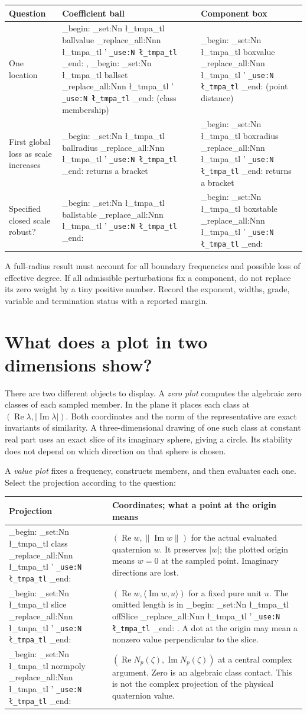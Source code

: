 \documentclass[11pt,a4paper]{article}
\newcommand{\m}[1]{
  \group_begin:
  \tl_set:Nn \l_tmpa_tl {#1}
  \tl_replace_all:Nnn \l_tmpa_tl {'}{\textquotesingle{}}
  \texttt{\tl_use:N \l_tmpa_tl}
  \group_end:
}
\newcommand{\topic}[2]{\clearpage\section{#1}\label{#2}}
\begin{document}
\par\smallskip\noindent\begin{tabularx}{\linewidth}{@{}p{.22\linewidth}YY@{}}\toprule
Question & Coefficient ball & Component box\\\midrule
One location & \m{ballvalue}, \m{ballset} (class membership) & \m{boxvalue} (point distance)\\
First global loss as scale increases & \m{ballradius} returns a bracket & \m{boxradius} returns a bracket\\
Specified closed scale robust? & \m{ballstable} & \m{boxstable}\\\bottomrule
\end{tabularx}\par\smallskip
A full-radius result must account for all boundary frequencies and possible loss of effective degree. If all admissible perturbations fix a component, do not replace its zero weight by a tiny positive number. Record the exponent, widths, grade, variable and termination status with a reported margin.
\topic{What does a plot in two dimensions show?}{sec:plot}
There are two different objects to display. A \emph{zero plot} computes the algebraic zero classes of each sampled member. In the plane it places each class at $(\operatorname{Re}\lambda,|\operatorname{Im}\lambda|)$. Both coordinates and the norm of the representative are exact invariants of similarity. A three-dimensional drawing of one such class at constant real part uses an exact slice of its imaginary sphere, giving a circle. Its stability does not depend on which direction on that sphere is chosen.
\par A \emph{value plot} fixes a frequency, constructs members, and then evaluates each one. Select the projection according to the question:
\par\smallskip\noindent\begin{tabularx}{\linewidth}{@{}p{.17\linewidth}Y@{}}\toprule
Projection & Coordinates; what a point at the origin means\\\midrule
\m{class} & $(\operatorname{Re}w,\|\operatorname{Im}w\|)$ for the actual evaluated quaternion $w$. It preserves $|w|$; the plotted origin means $w=0$ at the sampled point. Imaginary directions are lost.\\
\m{slice} & $(\operatorname{Re}w,\langle\operatorname{Im}w,u\rangle)$ for a fixed pure unit $u$. The omitted length is in \m{offSlice}. A dot at the origin may mean a nonzero value perpendicular to the slice.\\
\m{normpoly} & $(\operatorname{Re}N_p(\zeta),\operatorname{Im}N_p(\zeta))$ at a central complex argument. Zero is an algebraic class contact. This is not the complex projection of the physical quaternion value.\\\bottomrule
\end{tabularx}\par\smallskip
\end{document}
